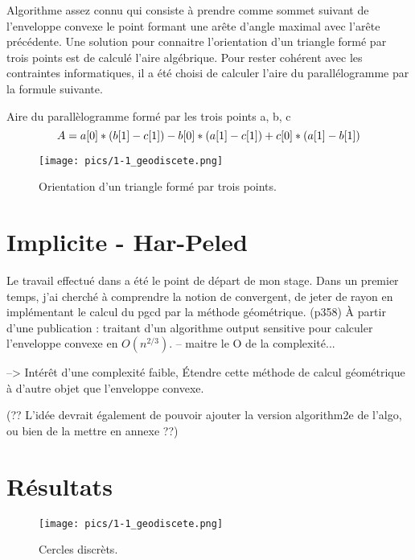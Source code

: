 Algorithme assez connu qui consiste à prendre comme sommet suivant de l'enveloppe convexe le point formant une arête d'angle maximal avec l'arête précédente. Une solution pour connaitre l'orientation d'un triangle formé par trois points est de calculé l'aire algébrique. Pour rester cohérent avec les contraintes informatiques, il a été choisi de calculer l'aire du parallélogramme par la formule suivante.

\begin{theorem}{Aire du parallèlogramme formé par les trois points a, b, c}\newline
$$\mathnormal{A} = a[0]*(b[1] - c[1]) - b[0]*(a[1] - c[1]) + c[0]*(a[1] - b[1]){}$$
\end{theorem}

\begin{figure}[h!]
\centering
   \texttt{[image: pics/1-1\_geodiscete.png]}
\caption{Orientation d'un triangle formé par trois points.}
\end{figure}

\section{Implicite - Har-Peled}
\label{pt3-ch2-sec:2}

Le travail effectué dans \cite{HarPeled98} a été le point de départ de mon stage. Dans un premier temps, j'ai cherché à comprendre la notion de convergent, de jeter de rayon en implémentant le calcul du pgcd par la méthode géométrique. (p358) \newline
À partir d'une publication : \cite{HarPeled98} traitant d'un algorithme output sensitive pour calculer l'enveloppe convexe en $O(n^{2/3})$. -- maitre le O de la complexité...\newline

--> Intérêt d'une complexité faible, Étendre cette méthode de calcul géométrique à d'autre objet que l'enveloppe convexe.

(?? L'idée devrait également de pouvoir ajouter la version algorithm2e de l'algo, ou bien de la mettre en annexe ??)

\section{Résultats}
\label{pt3-ch1-sec:2}

\begin{figure}[h!]
\centering
   \texttt{[image: pics/1-1\_geodiscete.png]}
\caption{Cercles discrèts.}
\end{figure}


